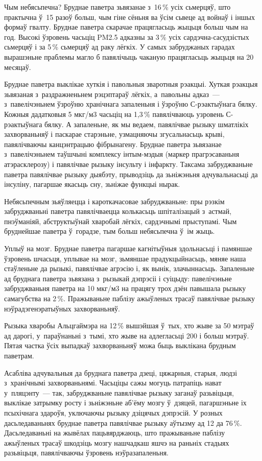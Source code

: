 Чым небясьпечна? Бруднае паветра зьвязанае з~16\,\% усіх сьмерцяў, што практычна ў~15 разоў больш, чым гіне сёньня ва ўсім сьвеце ад войнаў і іншых формаў гвалту. Бруднае паветра скарачае працягласьць жыцьця больш чым на год. Высокі ўзровень часьціц PM2.5 адказны за 3\,\% усіх сардэчна-сасудзістых сьмерцяў і за 5\,\% сьмерцяў ад раку лёгкіх. У самых забруджаных гарадах вырашэньне праблемы магло б павялічыць чаканую працягласьць жыцьця на 20 месяцаў.

Бруднае паветра выклікае хуткія і павольныя зваротныя рэакцыі. Хуткая рэакцыя зьвязаная з~раздражненьнем рэцэптараў лёгкіх, а~павольны адказ~--- з~павелічэньнем ўзроўню хранічнага запаленьня і ўзроўню С-рэактыўнага бялку. Кожныя дадатковыя 5 мкг/м3 часьціц на 1,3\,\% павялічваюць узровень С-рэактыўнага бялку. А запаленьне, як мы ведаем, павялічвае рызыку шматлікіх захворваньняў і паскарае старэньне, узмацняючы згусальнасьць крыві, павялічваючы канцэнтрацыю фібрынагену. Бруднае паветра зьвязанае з~павелічэньнем таўшчыні комплексу інтым-мэдыя (маркер прагрэсаваньня атэрасклерозу) і павялічвае рызыку інсульту і інфаркту. Таксама забруджваньне паветра павялічвае рызыку дыябэту, прыводзіць да зьніжэньня адчувальнасьці да інсуліну, пагаршае якасьць сну, зьніжае функцыі нырак.

Небясьпечным зьяўляецца і кароткачасовае забруджваньне: пры рэзкім забруджваньні паветра павялічваецца колькасьць шпіталізацый з~астмай, пнэўманіяй, абструктыўнай хваробай лёгкіх, сардэчнымі прыступамі. Чым бруднейшае паветра ў~горадзе, тым больш небясьпечна ў~ім жыць.

Уплыў на мозг. Бруднае паветра пагаршае кагнітыўныя здольнасьці і памяншае ўзровень шчасьця, уплывае на мозг, зьмяншае прадукцыйнасьць, мяняе наша стаўленьне да рызыкі, павялічвае агрэсію і, як вынік, злачыннасьць. Запаленьне ад бруднага паветра зьвязана з~рызыкай дэпрэсіі і суіцыду: павелічэньне забруджваньня паветра на 10 мкг/м3 на працягу трох дзён павышала рызыку самагубства на 2\,\%. Пражываньне паблізу ажыўленых трасаў павялічвае рызыку нэўрадэгенэратыўных захворваньняў.

Рызыка хваробы Альцгаймэра на 12\,\% вышэйшая ў~тых, хто жыве за 50 мэтраў ад дарогі, у~параўнаньні з~тымі, хто жыве на адлегласьці 200 і больш мэтраў. Пятая частка ўсіх выпадкаў захворваньняў можа быць выклікана брудным паветрам.

Асабліва адчувальныя да бруднага паветра дзеці, цяжарныя, старыя, людзі з~хранічнымі захворваньнямі. Часьціцы сажы могуць патрапіць нават у~пляцэнту~--- так, забруджваньне павялічвае рызыку заганаў разьвіцьця, выклікае затрымку росту і зьніжэньне аб'ёму мозгу ў~дзяцей, пагаршэньне іх псыхічнага здароўя, уключаючы рызыку дзіцячых дэпрэсій. У розных дасьледаваньнях бруднае паветра павялічвае рызыку аўтызму ад 12 да 76\,\%. Дасьледаваньні на жывёлах пацьвярджаюць, што пражываньне паблізу ажыўленых трасаў шкодзіць мозгу нашчадкаш яшчэ на раньніх стадыях разьвіцьця, павялічваючы ўзровень нэўразапаленьня.

